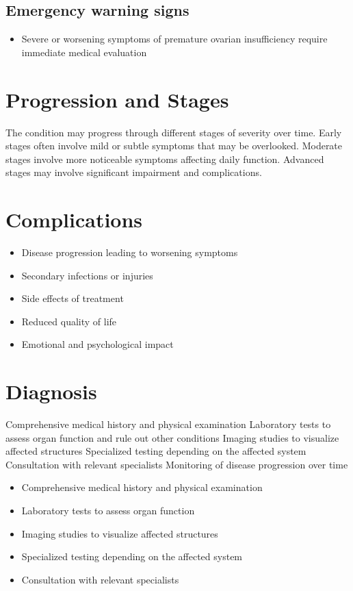 \subsection{Emergency warning signs}
\begin{itemize}[noitemsep]
  \item Severe or worsening symptoms of premature ovarian insufficiency require immediate medical evaluation
\end{itemize}
\section{Progression and Stages}
The condition may progress through different stages of severity over time. Early stages often involve mild or subtle symptoms that may be overlooked. Moderate stages involve more noticeable symptoms affecting daily function. Advanced stages may involve significant impairment and complications.
\section{Complications}
\begin{itemize}[noitemsep]
  \item Disease progression leading to worsening symptoms
  \item Secondary infections or injuries
  \item Side effects of treatment
  \item Reduced quality of life
  \item Emotional and psychological impact
\end{itemize}
\section{Diagnosis}
Comprehensive medical history and physical examination Laboratory tests to assess organ function and rule out other conditions Imaging studies to visualize affected structures Specialized testing depending on the affected system Consultation with relevant specialists Monitoring of disease progression over time

\begin{itemize}[noitemsep]
  \item Comprehensive medical history and physical examination
  \item Laboratory tests to assess organ function
  \item Imaging studies to visualize affected structures
  \item Specialized testing depending on the affected system
  \item Consultation with relevant specialists
\end{itemize}

